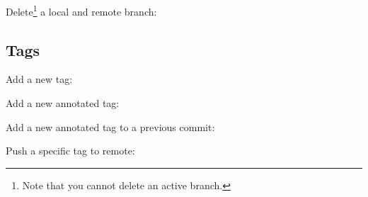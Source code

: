 \begin{flushleft}
\end{flushleft}
\vspace{-0.4cm}
\begin{flushleft}
\end{flushleft}

\begin{flushleft}
	Delete\footnote{Note that you cannot delete an active branch.} a local and remote branch:
\end{flushleft}

\begin{flushleft}
\end{flushleft}
\vspace{-0.4cm}
\begin{flushleft}
\end{flushleft}


\subsection{Tags}\label{git-tag}

\begin{flushleft}
	Add a new tag:
\end{flushleft}

\begin{flushleft}
\end{flushleft}

\begin{flushleft}
	Add a new annotated tag:
\end{flushleft}

\begin{flushleft}
\end{flushleft}

\begin{flushleft}
	Add a new annotated tag to a previous commit:
\end{flushleft}

\begin{flushleft}
\end{flushleft}

\begin{flushleft}
	Push a specific tag to remote:
\end{flushleft}

